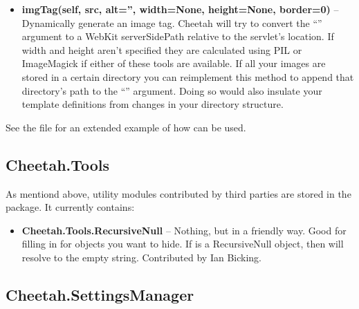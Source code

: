 \begin{itemize}
\item {\bf imgTag(self, src, alt='', width=None, height=None, border=0)} --
     Dynamically generate an image tag.  Cheetah will try to convert the
     ``'' argument to a WebKit serverSidePath relative to the
     servlet's location. If width and height aren't specified they are
     calculated using PIL or ImageMagick if either of these tools are available.
     If all your images are stored in a certain directory you can reimplement
     this method to append that directory's path to the ``'' argument.
     Doing so would also insulate your template definitions from changes in your
     directory structure.
\end{itemize}

See the file  for
an extended example of how  can be used.

\subsection{Cheetah.Tools}
\label{libraries.tools}

As mentiond above, utility modules contributed by third parties are stored in
the  package. It currently contains:

\begin{itemize}
\item {\bf Cheetah.Tools.RecursiveNull} -- Nothing, but in a friendly way.  Good
     for filling in for objects you want to hide.  If  is a
     RecursiveNull object, then  will
     resolve to the empty string. Contributed by Ian Bicking.
\end{itemize}

\subsection{Cheetah.SettingsManager}
\label{libraries.SettingsManager}

